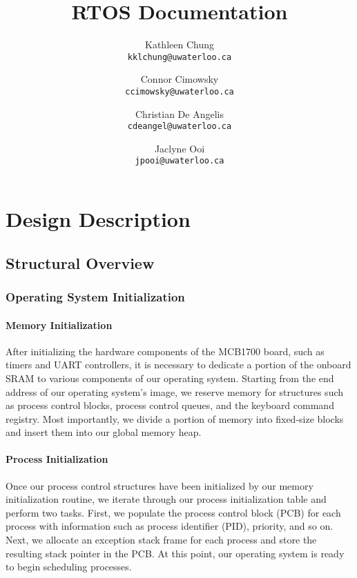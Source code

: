 \documentclass[12pt]{report}
\begin{document}
\title{RTOS Documentation}

\author{
    Kathleen Chung\\
    \texttt{kklchung@uwaterloo.ca}
    \and
    Connor Cimowsky\\
    \texttt{ccimowsky@uwaterloo.ca}
    \and
    Christian De Angelis\\
    \texttt{cdeangel@uwaterloo.ca}
    \and
    Jaclyne Ooi\\
    \texttt{jpooi@uwaterloo.ca}
}

\maketitle

\tableofcontents

\part{Design Description}

\chapter{Structural Overview}

\section{Operating System Initialization}

\subsection{Memory Initialization}

After initializing the hardware components of the MCB1700 board, such as timers and UART controllers, it is necessary to dedicate a portion of the onboard SRAM to various components of our operating system. Starting from the end address of our operating system's image, we reserve memory for structures such as process control blocks, process control queues, and the keyboard command registry. Most importantly, we divide a portion of memory into fixed-size blocks and insert them into our global memory heap.

\subsection{Process Initialization}

Once our process control structures have been initialized by our memory initialization routine, we iterate through our process initialization table and perform two tasks. First, we populate the process control block (PCB) for each process with information such as process identifier (PID), priority, and so on. Next, we allocate an exception stack frame for each process and store the resulting stack pointer in the PCB. At this point, our operating system is ready to begin scheduling processes.
\end{document}
